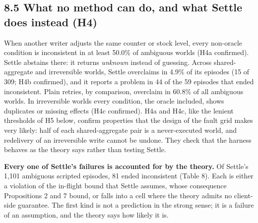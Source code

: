 \documentclass[
  10pt,
]{article}
\begin{document}
\hypertarget{what-no-method-can-do-and-what-settle-does-instead-h4}{%
\subsection*{8.5 What no method can do, and what Settle does instead
(H4)}\label{what-no-method-can-do-and-what-settle-does-instead-h4}}

When another writer adjusts the same counter or stock level, every
non-oracle condition is inconsistent in at least 50.0\% of ambiguous
worlds (H4a confirmed). Settle abstains there: it returns \emph{unknown}
instead of guessing. Across shared-aggregate and irreversible worlds,
Settle overclaims in 4.9\% of its episodes (15 of 309; H4b confirmed),
and it reports a problem in 44 of the 59 episodes that ended
inconsistent. Plain retries, by comparison, overclaim in 60.8\% of all
ambiguous worlds. In irreversible worlds every condition, the oracle
included, shows duplicates or missing effects (H4c confirmed). H4a and
H4c, like the lenient thresholds of H5 below, confirm properties that
the design of the fault grid makes very likely: half of each
shared-aggregate pair is a never-executed world, and redelivery of an
irreversible write cannot be undone. They check that the harness behaves
as the theory says rather than testing Settle.

\textbf{Every one of Settle's failures is accounted for by the theory.}
Of Settle's 1,101 ambiguous scripted episodes, 81 ended inconsistent
(Table 8). Each is either a violation of the in-flight bound that Settle
assumes, whose consequence Propositions 2 and 7 bound, or falls into a
cell where the theory admits no client-side guarantee. The first kind is
not a prediction in the strong sense; it is a failure of an assumption,
and the theory says how likely it is.
\end{document}
